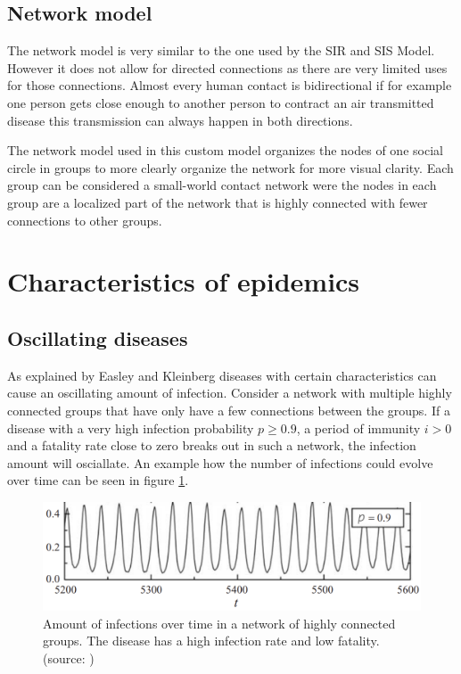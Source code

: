 \subsection{Network model}
The network model is very similar to the one used by the SIR and SIS Model. However it does
not allow for directed connections as there are very limited uses for those connections. 
Almost every human contact is bidirectional if for example one person gets close enough to
another person to contract an air transmitted disease this transmission can always happen
in both directions.

The network model used in this custom model organizes the nodes of one social circle in groups
to more clearly organize the network for more visual clarity. Each group can be 
considered a small-world %
contact network were the nodes in each group are a localized part
of the network that is highly connected with fewer connections to other groups.

\section{Characteristics of epidemics}
\subsection{Oscillating diseases}
As explained by Easley and Kleinberg \cite{networks} diseases with certain characteristics
can cause an oscillating amount of infection. Consider a network with multiple highly
connected groups that have only have a few connections between the groups. If a disease
with a very high infection probability $p\geq0.9$, a period of immunity $i > 0$ and a
fatality rate close to zero breaks out in such a network, the infection amount will osciallate.
An example how the number of infections could evolve over time can be seen in figure 
\ref{fig:oscillation}.
\begin{figure}
    \centering
    \includegraphics[width=0.5\linewidth]{images/oscillation.png}
    \caption{Amount of infections over time in a network of highly connected 
    groups. The disease has a high infection rate and low fatality. (source: \cite{networks})}
    \label{fig:oscillation}
\end{figure}

